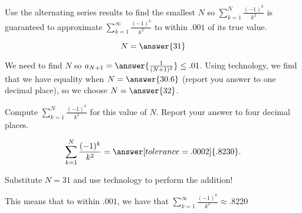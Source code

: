 \documentclass{ximera}
\author{Jim Talamo}
\begin{document}
\begin{exercise}
Use the alternating series results to find the smallest $N$ so $\sum_{k=1}^N \frac{(-1)^k}{k^2}$ is guaranteed to approximate $\sum_{k=1}^\infty \frac{(-1)^k}{k^2}$ to within $.001$ of its true value.  

\[
N = \answer{ 31 } 
\]

\begin{hint}
We need to find $N$ so $a_{N+1} = \answer{\frac{1}{(N+1)^2}} \leq .01$.  Using technology, we find that we have equality when $N=\answer{30.6}$ (report you answer to one decimal place), so we choose $N = \answer{32}$.
\end{hint}

\begin{exercise}
Compute  $\sum_{k=1}^N \frac{(-1)^k}{k^2}$ for this value of $N$.  Report your answer to four decimal places.

\[
\sum_{k=1}^N \frac{(-1)^k}{k^2} = \answer[tolerance=.0002]{.8230}. 
\]

\begin{hint}
Substitute $N=31$ and use technology to perform the addition!
\end{hint}
\begin{feedback}
This means that to within $.001$, we have that $\sum_{k=1}^\infty \frac{(-1)^k}{k^2} \approx .8220 $
\end{feedback}
\end{exercise}
\end{exercise}
\end{document}
